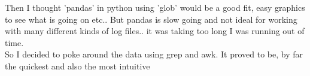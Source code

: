 \documentclass[
	letterpaper, %
	10pt, %
	unnumberedsections, %
	twoside, %
]{APAAssignment}
\begin{document}
\begin{appendices}
	Then I thought 'pandas' in python using 'glob' would be a good fit, easy graphics to see what is going on etc.. But pandas is slow going and not ideal for working with many different kinds of log files.. it was taking too long I was running out of time. \\

	So I decided to poke around the data using grep and awk. It proved to be, by far the quickest and also the most intuitive

\end{appendices}
\end{document}
